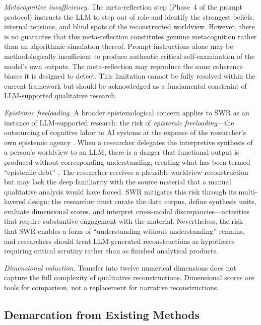 \documentclass[11pt,a4paper]{article}
\theoremstyle{definition}
\theoremstyle{plain}
\theoremstyle{remark}
\begin{document}
\emph{Metacognitive insufficiency.} The meta-reflection step (Phase~4 of the prompt protocol) instructs the LLM to step out of role and identify the strongest beliefs, internal tensions, and blind spots of the reconstructed worldview. However, there is no guarantee that this meta-reflection constitutes genuine metacognition rather than an algorithmic simulation thereof. Prompt instructions alone may be methodologically insufficient to produce authentic critical self-examination of the model's own outputs. The meta-reflection may reproduce the same coherence biases it is designed to detect. This limitation cannot be fully resolved within the current framework but should be acknowledged as a fundamental constraint of LLM-supported qualitative research.

\emph{Epistemic freeloading.} A broader epistemological concern applies to SWR as an instance of LLM-supported research: the risk of \emph{epistemic freeloading}---the outsourcing of cognitive labor to AI systems at the expense of the researcher's own epistemic agency \citep{Danaher2018, Messeri2024}. When a researcher delegates the interpretive synthesis of a person's worldview to an LLM, there is a danger that functional output is produced without corresponding understanding, creating what has been termed ``epistemic debt'' \citep{Sankaranarayanan2026}. The researcher receives a plausible worldview reconstruction but may lack the deep familiarity with the source material that a manual qualitative analysis would have forced. SWR mitigates this risk through its multi-layered design: the researcher must curate the data corpus, define synthesis units, evaluate dimensional scores, and interpret cross-modal discrepancies---activities that require substantive engagement with the material. Nevertheless, the risk that SWR enables a form of ``understanding without understanding'' remains, and researchers should treat LLM-generated reconstructions as hypotheses requiring critical scrutiny rather than as finished analytical products.

\emph{Dimensional reduction.} Transfer into twelve numerical dimensions does not capture the full complexity of qualitative reconstructions. Dimensional scores are tools for comparison, not a replacement for narrative reconstructions.


\subsection{Demarcation from Existing Methods}
\end{document}
